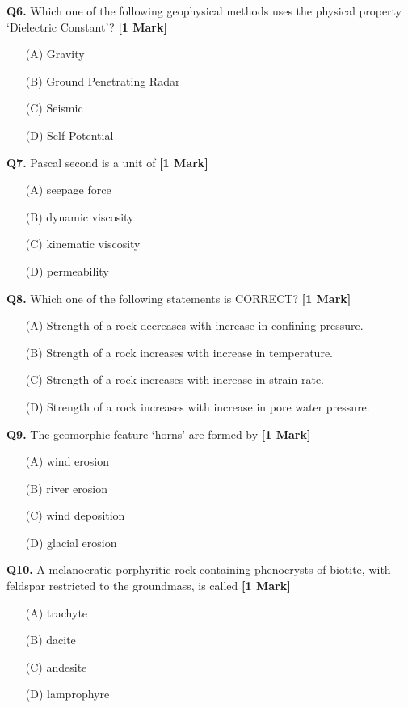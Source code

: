 \documentclass[11pt]{article}
\newcommand{\questiona}[2]{
    \noindent\textbf{Q#2.} #1 \hfill \textbf{[1 Mark]}
}
\begin{document}
\questiona{Which one of the following geophysical methods uses the physical property ‘Dielectric Constant’?}{6}
\begin{enumerate}
    \item[(A)] Gravity
    \item[(B)] Ground Penetrating Radar
    \item[(C)] Seismic
    \item[(D)] Self-Potential
\end{enumerate}
\vspace{0.5cm}

\questiona{Pascal second is a unit of}{7}
\begin{enumerate}
    \item[(A)] seepage force
    \item[(B)] dynamic viscosity
    \item[(C)] kinematic viscosity
    \item[(D)] permeability
\end{enumerate}
\vspace{0.5cm}

\questiona{Which one of the following statements is CORRECT?}{8}
\begin{enumerate}
    \item[(A)] Strength of a rock decreases with increase in confining pressure.
    \item[(B)] Strength of a rock increases with increase in temperature.
    \item[(C)] Strength of a rock increases with increase in strain rate.
    \item[(D)] Strength of a rock increases with increase in pore water pressure.
\end{enumerate}
\vspace{0.5cm}

\questiona{The geomorphic feature ‘horns’ are formed by}{9}
\begin{enumerate}
    \item[(A)] wind erosion
    \item[(B)] river erosion
    \item[(C)] wind deposition
    \item[(D)] glacial erosion
\end{enumerate}
\vspace{0.5cm}

\questiona{A melanocratic porphyritic rock containing phenocrysts of biotite, with feldspar restricted to the groundmass, is called}{10}
\begin{enumerate}
    \item[(A)] trachyte
    \item[(B)] dacite
    \item[(C)] andesite
    \item[(D)] lamprophyre
\end{enumerate}
\vspace{0.5cm}
\end{document}

